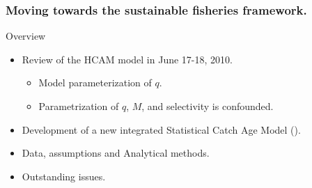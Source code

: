 



\begin{frame} %
	\frametitle{Moving towards the sustainable fisheries framework.}
	\begin{block}
		{Overview}
		\begin{itemize}
			\item Review of the HCAM model in June 17-18, 2010.
			\begin{itemize}
				\item Model parameterization of $q$.
				\item Parametrization of $q$, $M$, and selectivity is confounded.
			\end{itemize}
			\item Development of a new integrated Statistical Catch Age Model (\iscam).
			\item Data, assumptions and Analytical methods.
			\item Outstanding issues.
		\end{itemize}
	\end{block}
\end{frame}


